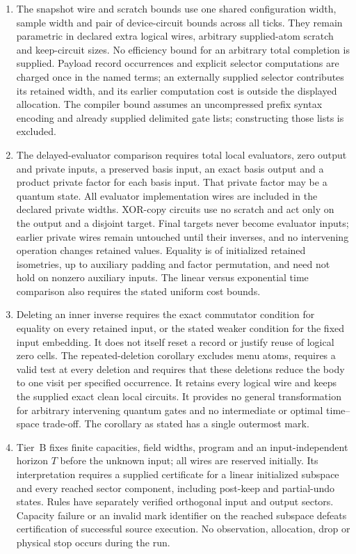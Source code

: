 \begin{enumerate}
$N(P)-q_{\rm in}$ ticks, and preparing a nonzero initial configuration
is additional (Theorem~\ref{thm:resA-resources}).
\item The snapshot wire and scratch bounds use one shared configuration width, sample width and pair of device-circuit bounds across all ticks. They remain parametric in declared extra logical wires, arbitrary supplied-atom scratch and keep-circuit sizes. No efficiency bound for an arbitrary total completion is supplied. Payload record occurrences and explicit selector computations are charged once in the named terms; an externally supplied selector contributes its retained width, and its earlier computation cost is outside the displayed allocation. The compiler bound assumes an uncompressed prefix syntax encoding and already supplied delimited gate lists; constructing those lists is excluded.
\item The delayed-evaluator comparison requires total local evaluators, zero output and private inputs, a preserved basis input, an exact basis output and a product private factor for each basis input. That private factor may be a quantum state. All evaluator implementation wires are included in the declared private widths. XOR-copy circuits use no scratch and act only on the output and a disjoint target. Final targets never become evaluator inputs; earlier private wires remain untouched until their inverses, and no intervening operation changes retained values. Equality is of initialized retained isometries, up to auxiliary padding and factor permutation, and need not hold on nonzero auxiliary inputs. The linear versus exponential time comparison also requires the stated uniform cost bounds.
\item Deleting an inner inverse requires the exact commutator condition for equality on every retained input, or the stated weaker condition for the fixed input embedding. It does not itself reset a record or justify reuse of logical zero cells. The repeated-deletion corollary excludes menu atoms, requires a valid test at every deletion and requires that these deletions reduce the body to one visit per specified occurrence. It retains every logical wire and keeps the supplied exact clean local circuits. It provides no general transformation for arbitrary intervening quantum gates and no intermediate or optimal time--space trade-off. The corollary as stated has a single outermost mark.
\item Tier~B fixes finite capacities, field widths, program and an input-independent horizon $T$ before the unknown input; all wires are reserved initially. Its interpretation requires a supplied certificate for a linear initialized subspace and every reached sector component, including post-keep and partial-undo states. Rules have separately verified orthogonal input and output sectors. Capacity failure or an invalid mark identifier on the reached subspace defeats certification of successful source execution. No observation, allocation, drop or physical stop occurs during the run.

\end{enumerate}
